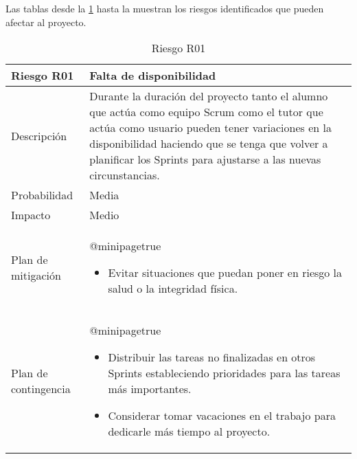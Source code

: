 Las tablas desde la \ref{riesgo_1} hasta la muestran los riesgos identificados que pueden afectar al proyecto.

\begin{table}[!htbp]
	\centering
	\begin{tabularx}{\textwidth}{|l|X|}
		\hline
		\rowcolor[HTML]{C0C0C0} 
		\textbf{Riesgo R01}  & \textbf{Falta de disponibilidad}                                                                                                                                                                                                                                                                                    \\ \hline
		Descripción          & Durante la duración del proyecto tanto el alumno que actúa como equipo Scrum como el tutor que actúa como usuario pueden tener variaciones en la disponibilidad haciendo que se tenga que volver a planificar los Sprints para ajustarse a las nuevas circunstancias.\\ \hline
		Probabilidad         & Media                                                                                                                                                                                                                                                                                                               \\ \hline
		Impacto              & Medio                                                                                                                                                                                                                                                                                                               \\ \hline
		Plan de mitigación   & \csname @minipagetrue\endcsname \begin{itemize}[leftmargin=*, noitemsep, topsep=0pt]
			\item Evitar situaciones que puedan poner en riesgo la salud o la integridad física.
		\end{itemize} \\ \hline
		Plan de contingencia & \csname @minipagetrue\endcsname \begin{itemize}[leftmargin=*, noitemsep, topsep=0pt]
			\item Distribuir las tareas no finalizadas en otros Sprints estableciendo prioridades para las tareas más importantes.
			\item Considerar tomar vacaciones en el trabajo para dedicarle más tiempo al proyecto.
		\end{itemize} \\ \hline
	\end{tabularx}
	\caption{Riesgo R01}
	\label{riesgo_1}
\end{table}

